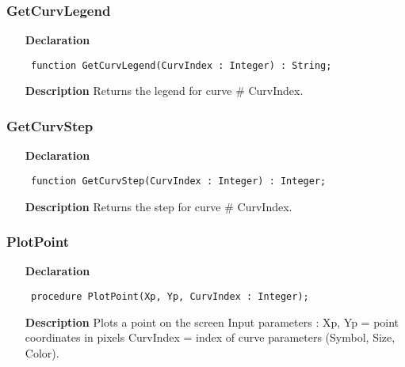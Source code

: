 \documentclass[12pt,a4paper,oneside]{report}
\newcommand{\declarationitem}[1]{\textbf{#1}}
\newcommand{\descriptiontitle}[1]{\textbf{#1}}
\newcommand{\code}[1]{\texttt{#1}}
\begin{document}
\subsubsection{GetCurvLegend}
\label{uplot-GetCurvLegend}
\begin{itemize}\item[\declarationitem{Declaration}\hfill]
	\begin{flushleft}
		\code{
			function GetCurvLegend(CurvIndex : Integer) : String;}
		
	\end{flushleft}
	
	\par
	\item[\descriptiontitle{Description}]
	Returns the legend for curve {\#} CurvIndex.
	
\end{itemize}
\subsubsection{GetCurvStep}
\label{uplot-GetCurvStep}
\begin{itemize}\item[\declarationitem{Declaration}\hfill]
	\begin{flushleft}
		\code{
			function GetCurvStep(CurvIndex : Integer) : Integer;}
		
	\end{flushleft}
	
	\par
	\item[\descriptiontitle{Description}]
	Returns the step for curve {\#} CurvIndex.
	
\end{itemize}
\subsubsection{PlotPoint}
\label{uplot-PlotPoint}
\begin{itemize}\item[\declarationitem{Declaration}\hfill]
	\begin{flushleft}
		\code{
			procedure PlotPoint(Xp, Yp, CurvIndex : Integer);}
		
	\end{flushleft}
	
	\par
	\item[\descriptiontitle{Description}]
	Plots a point on the screen Input parameters : Xp, Yp = point coordinates in pixels CurvIndex = index of curve parameters (Symbol, Size, Color).
	
\end{itemize}
\end{document}
